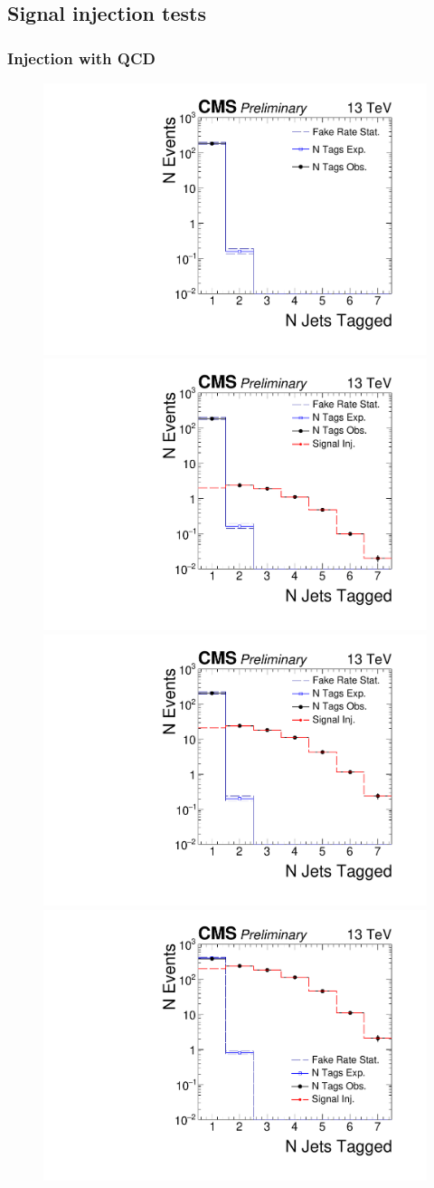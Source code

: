 \subsection{Signal injection tests} 

\subsubsection{Injection with QCD}


\begin{figure}
\begin{center}
\includegraphics[width=.45\textwidth]{figures/an/ANALYSIS/76x_pu/INJECTION/qcd_loose_displacedEvtSel_0eV.pdf}\\
\includegraphics[width=.45\textwidth]{figures/an/ANALYSIS/76x_pu/INJECTION/qcd_loose_displacedEvtSel_10eV.pdf}
\includegraphics[width=.45\textwidth]{figures/an/ANALYSIS/76x_pu/INJECTION/qcd_loose_displacedEvtSel_100eV.pdf}\\
\includegraphics[width=.45\textwidth]{figures/an/ANALYSIS/76x_pu/INJECTION/qcd_loose_displacedEvtSel_1000eV.pdf}

\end{center}
\end{figure}
